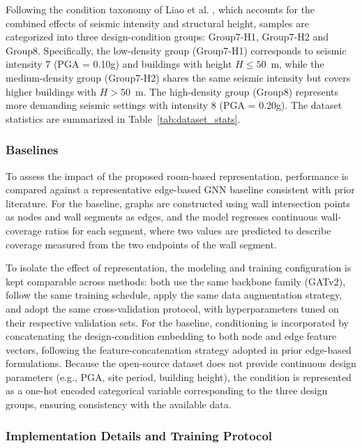 Following the condition taxonomy of Liao et al. \cite{zhaoIntelligentDesignShear2023b}, which accounts for the combined effects of seismic intensity and structural height, samples are categorized into three design-condition groups: Group7-H1, Group7-H2 and Group8. Specifically, the low-density group (Group7-H1) corresponds to seismic intensity 7 (PGA = 0.10g) and buildings with height $H \le 50$~m, while the medium-density group (Group7-H2) shares the same seismic intensity but covers higher buildings with $H > 50$~m. The high-density group (Group8) represents more demanding seismic settings with intensity 8 (PGA = 0.20g). The dataset statistics are summarized in Table~\ref{tab:dataset_stats}.



\subsubsection{Baselines}
\label{subsubsec:baselines}

To assess the impact of the proposed room-based representation, performance is compared against a representative edge-based GNN baseline consistent with prior literature. For the baseline, graphs are constructed using wall intersection points as nodes and wall segments as edges, and the model regresses continuous wall-coverage ratios for each segment, where two values are predicted to describe coverage measured from the two endpoints of the wall segment.

To isolate the effect of representation, the modeling and training configuration is kept comparable across methods: both use the same backbone family (GATv2), follow the same training schedule, apply the same data augmentation strategy, and adopt the same cross-validation protocol, with hyperparameters tuned on their respective validation sets. For the baseline, conditioning is incorporated by concatenating the design-condition embedding to both node and edge feature vectors, following the feature-concatenation strategy adopted in prior edge-based formulations. Because the open-source dataset does not provide continuous design parameters (e.g., PGA, site period, building height), the condition is represented as a one-hot encoded categorical variable corresponding to the three design groups, ensuring consistency with the available data.


\subsubsection{Implementation Details and Training Protocol}
\label{subsubsec:implementation}

